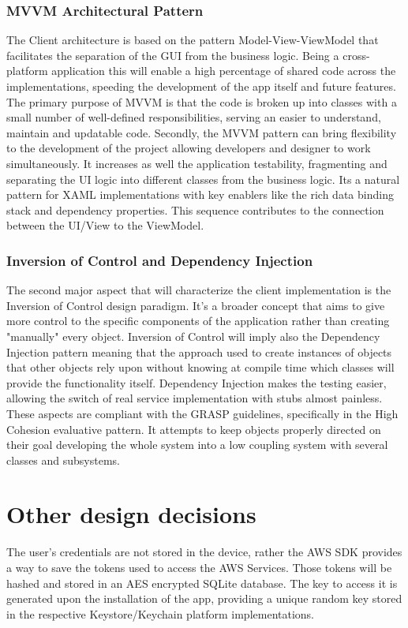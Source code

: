 \subsubsection*{MVVM Architectural Pattern}
The Client architecture is based on the pattern Model-View-ViewModel that facilitates the separation of the GUI from the business logic. Being a cross-platform application this will enable a high percentage of shared code across the implementations, speeding the development of the app itself and future features.
\newline The primary purpose of MVVM is that the code is broken up into classes with a small number of well-defined responsibilities, serving an easier to understand, maintain and updatable code.
\newline Secondly, the MVVM pattern can bring flexibility to the development of the project allowing developers and designer to work simultaneously.
It increases as well the application testability, fragmenting and separating the UI logic into different classes from the business logic.
Its a natural pattern for XAML implementations with key enablers like the rich data binding stack and dependency properties. 
This sequence contributes to the connection between the UI/View to the ViewModel.

\subsubsection*{Inversion of Control and Dependency Injection}

The second major aspect that will characterize the client implementation is the Inversion of Control design paradigm. 
It's a broader concept that aims to give more control to the specific components of the application rather than creating "manually" every object.
Inversion of Control will imply also the Dependency Injection pattern meaning that the approach used to create instances of objects that other objects rely upon without knowing at compile time which classes will provide the functionality itself.
Dependency Injection makes the testing easier, allowing the switch of real service implementation with stubs almost painless.
These aspects are compliant with the GRASP guidelines, specifically in the High Cohesion evaluative pattern.
It attempts to keep objects properly directed on their goal developing the whole system into a low coupling system with several classes and subsystems.

\section{Other design decisions}
\label{sec:des_dec}
The user's credentials are not stored in the device, rather the AWS SDK provides a way to save the tokens used to access the AWS Services.
Those tokens will be hashed and stored in an AES encrypted SQLite database. The key to access it is generated upon the installation of the app, providing a unique random key stored in the respective Keystore/Keychain platform implementations.


